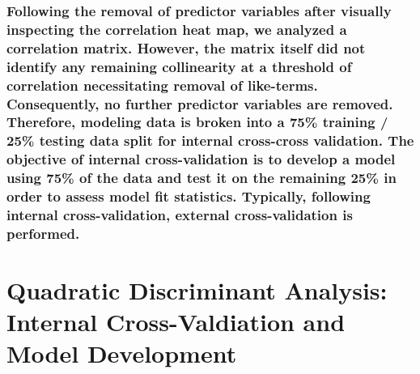 \documentclass[american,]{article}
\begin{document}
\hypertarget{following-the-removal-of-predictor-variables-after-visually-inspecting-the-correlation-heat-map-we-analyzed-a-correlation-matrix.-however-the-matrix-itself-did-not-identify-any-remaining-collinearity-at-a-threshold-of-correlation-necessitating-removal-of-like-terms.-consequently-no-further-predictor-variables-are-removed.-therefore-modeling-data-is-broken-into-a-75-training-25-testing-data-split-for-internal-cross-cross-validation.-the-objective-of-internal-cross-validation-is-to-develop-a-model-using-75-of-the-data-and-test-it-on-the-remaining-25-in-order-to-assess-model-fit-statistics.-typically-following-internal-cross-validation-external-cross-validation-is-performed.}{%
\subsubsection{Following the removal of predictor variables after visually inspecting the correlation heat map, we analyzed a correlation matrix. However, the matrix itself did not identify any remaining collinearity at a threshold of correlation necessitating removal of like-terms. Consequently, no further predictor variables are removed. Therefore, modeling data is broken into a 75\% training / 25\% testing data split for internal cross-cross validation. The objective of internal cross-validation is to develop a model using 75\% of the data and test it on the remaining 25\% in order to assess model fit statistics. Typically, following internal cross-validation, external cross-validation is performed.}\label{following-the-removal-of-predictor-variables-after-visually-inspecting-the-correlation-heat-map-we-analyzed-a-correlation-matrix.-however-the-matrix-itself-did-not-identify-any-remaining-collinearity-at-a-threshold-of-correlation-necessitating-removal-of-like-terms.-consequently-no-further-predictor-variables-are-removed.-therefore-modeling-data-is-broken-into-a-75-training-25-testing-data-split-for-internal-cross-cross-validation.-the-objective-of-internal-cross-validation-is-to-develop-a-model-using-75-of-the-data-and-test-it-on-the-remaining-25-in-order-to-assess-model-fit-statistics.-typically-following-internal-cross-validation-external-cross-validation-is-performed.}}

\hypertarget{quadratic-discriminant-analysis-internal-cross-valdiation-and-model-development}{%
\section{\texorpdfstring{\textbf{Quadratic Discriminant Analysis: Internal Cross-Valdiation and Model Development}}{Quadratic Discriminant Analysis: Internal Cross-Valdiation and Model Development}}\label{quadratic-discriminant-analysis-internal-cross-valdiation-and-model-development}}
\end{document}
